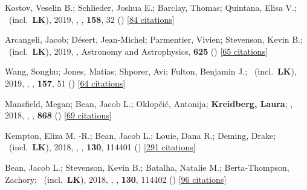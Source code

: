 \item[{\color{numcolor}\scriptsize28}] Kostov, Veselin B.; Schlieder, Joshua E.; Barclay, Thomas; Quintana, Elisa V.; \etal\ (incl.\ \textbf{LK}), 2019, , \aj, \textbf{158}, 32 () [\href{https://ui.adsabs.harvard.edu/abs/2019AJ....158...32K}{84 citations}]

\item[{\color{numcolor}\scriptsize27}] Arcangeli, Jacob; D{\'e}sert, Jean-Michel; Parmentier, Vivien; Stevenson, Kevin B.; \etal\ (incl.\ \textbf{LK}), 2019, , Astronomy and Astrophysics, \textbf{625} () [\href{https://ui.adsabs.harvard.edu/abs/2019A&A...625A.136A}{65 citations}]

\item[{\color{numcolor}\scriptsize26}] Wang, Songhu; Jones, Matias; Shporer, Avi; Fulton, Benjamin J.; \etal\ (incl.\ \textbf{LK}), 2019, , \aj, \textbf{157}, 51 () [\href{https://ui.adsabs.harvard.edu/abs/2019AJ....157...51W}{64 citations}]

\item[{\color{numcolor}\scriptsize25}] Mansfield, Megan; Bean, Jacob L.; Oklop{\v{c}}i{\'c}, Antonija; \textbf{Kreidberg, Laura}; \etal, 2018, , \apj, \textbf{868} () [\href{https://ui.adsabs.harvard.edu/abs/2018ApJ...868L..34M}{69 citations}]

\item[{\color{numcolor}\scriptsize24}] Kempton, Eliza M. -R.; Bean, Jacob L.; Louie, Dana R.; Deming, Drake; \etal\ (incl.\ \textbf{LK}), 2018, , \pasp, \textbf{130}, 114401 () [\href{https://ui.adsabs.harvard.edu/abs/2018PASP..130k4401K}{291 citations}]

\item[{\color{numcolor}\scriptsize23}] Bean, Jacob L.; Stevenson, Kevin B.; Batalha, Natalie M.; Berta-Thompson, Zachory; \etal\ (incl.\ \textbf{LK}), 2018, , \pasp, \textbf{130}, 114402 () [\href{https://ui.adsabs.harvard.edu/abs/2018PASP..130k4402B}{96 citations}]

